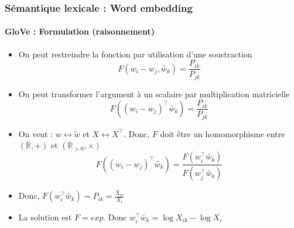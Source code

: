 \documentclass[xcolor=table]{beamer}
\begin{document}
\begin{frame}
\frametitle{Sémantique lexicale : Word embedding}
\framesubtitle{GloVe : Formulation (raisonnement)}
	
\begin{itemize}
	\item On peut restreindre la fonction par utilisation d'une soustraction
	\vspace{-6pt}\[F(w_i - w_j, \tilde{w_k}) = \frac{P_{ik}}{P_{jk}}\]
	
	\item On peut transformer l'argument à un scalaire par multiplication matricielle
	\vspace{-6pt}\[F((w_i - w_j)^\top \tilde{w_k}) = \frac{P_{ik}}{P_{jk}}\]
	
	\item On veut : $w \leftrightarrow \tilde{w}$ et $X \leftrightarrow X^\top$. Donc, $F$ doit être un homomorphisme entre $(\mathbb{R}, +)$ et $(\mathbb{R}_{>0}, \times)$
	\vspace{-6pt}\[F((w_i - w_j)^\top \tilde{w_k}) = \frac{F(w_i^\top \tilde{w_k})}{F(w_j^\top \tilde{w_k})}\]
	
	\item Donc, $F(w_i^\top \tilde{w_k}) = P_{ik} = \frac{X_{ik}}{X_i}$
	
	\item La solution est $F = exp$. Donc $w_i^\top \tilde{w_k} = \log X_{ik} - \log X_i$
\end{itemize}
	
\end{frame}
\end{document}
